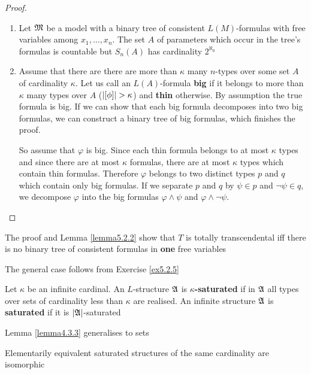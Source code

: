 \documentclass[11pt]{article}
\begin{document}
\begin{proof}
\begin{enumerate}
\item Let \(\mathfrak{M}\) be a model with a binary tree of consistent \(L(M)\)-formulas with free variables
among \(x_1,\dots,x_n\). The set \(A\) of parameters which occur in the tree's formulas is
countable but \(S_n(A)\) has cardinality \(2^{\aleph_0}\)
\item Assume that there are there are more than \(\kappa\) many \(n\)-types over some set \(A\) of
cardinality \(\kappa\). Let us call an \(L(A)\)-formula \textbf{big} if it belongs to more than \(\kappa\) many types
over \(A\) (\(\abs{[\phi]}>\kappa\)) and \textbf{thin} otherwise. By assumption the true formula is big. If we
can show that each big formula decomposes into two big formulas, we can construct a binary
tree of big formulas, which finishes the proof.

So assume that \(\varphi\) is big. Since each thin formula belongs to at most \(\kappa\) types and since there
are at most \(\kappa\) formulas, there are at most \(\kappa\) types which contain thin formulas. Therefore
\(\varphi\) belongs to two distinct types \(p\) and \(q\) which contain only big formulas. If we
separate \(p\) and \(q\) by \(\psi\in p\) and \(\neg\psi\in q\), we decompose \(\varphi\) into the big
formulas \(\varphi\wedge\psi\) and \(\varphi\wedge\neg\psi\).
\end{enumerate}
\end{proof}

The proof and Lemma \ref{lemma5.2.2} show that \(T\) is totally transcendental iff there is no
binary tree of consistent formulas in \textbf{one} free variables

The general case follows from Exercise \ref{ex5.2.5}

\begin{definition}[]
Let \(\kappa\) be an infinite cardinal. An \(L\)-structure \(\mathfrak{A}\) is \textbf{\(\kappa\)-saturated} if in \(\mathfrak{A}\) all
types over sets of cardinality less than \(\kappa\) are realised. An infinite structure \(\mathfrak{A}\) is \textbf{saturated}
if it is \(\abs{\fA}\)-saturated
\end{definition}

Lemma \ref{lemma4.3.3} generalises to sets

\begin{lemma}[]
\label{lemma5.2.8}
Elementarily equivalent saturated structures of the same cardinality are isomorphic
\end{lemma}
\end{document}
